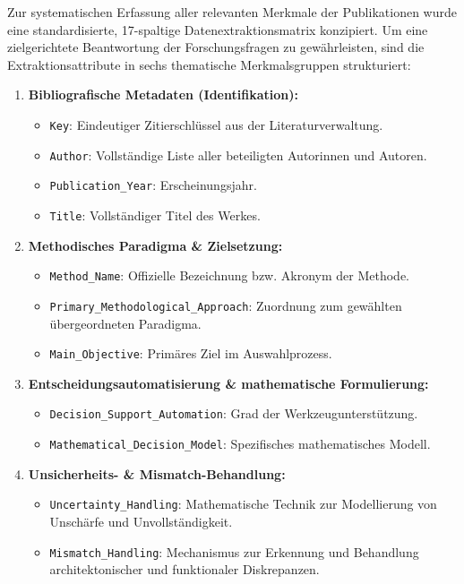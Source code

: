 Zur systematischen Erfassung aller relevanten Merkmale der Publikationen wurde eine standardisierte, 17-spaltige Datenextraktionsmatrix konzipiert. Um eine zielgerichtete Beantwortung der Forschungsfragen zu gewährleisten, sind die Extraktionsattribute in sechs thematische Merkmalsgruppen strukturiert:
\begin{enumerate}[label=\textbf{Gruppe \Roman*:}, leftmargin=*]
  \item \textbf{Bibliografische Metadaten (Identifikation):}
  \begin{itemize}[leftmargin=*]
    \item \texttt{Key}: Eindeutiger Zitierschlüssel aus der Literaturverwaltung.
    \item \texttt{Author}: Vollständige Liste aller beteiligten Autorinnen und Autoren.
    \item \texttt{Publication\_Year}: Erscheinungsjahr.
    \item \texttt{Title}: Vollständiger Titel des Werkes.
  \end{itemize}
  \item \textbf{Methodisches Paradigma \& Zielsetzung:}
  \begin{itemize}[leftmargin=*]
    \item \texttt{Method\_Name}: Offizielle Bezeichnung bzw. Akronym der Methode.
    \item \texttt{Primary\_Methodological\_Approach}: Zuordnung zum gewählten übergeordneten Paradigma.
    \item \texttt{Main\_Objective}: Primäres Ziel im Auswahlprozess.
  \end{itemize}
  \item \textbf{Entscheidungsautomatisierung \& mathematische Formulierung:}
  \begin{itemize}[leftmargin=*]
    \item \texttt{Decision\_Support\_Automation}: Grad der Werkzeugunterstützung.
    \item \texttt{Mathematical\_Decision\_Model}: Spezifisches mathematisches Modell.
  \end{itemize}
  \item \textbf{Unsicherheits- \& Mismatch-Behandlung:}
  \begin{itemize}[leftmargin=*]
    \item \texttt{Uncertainty\_Handling}: Mathematische Technik zur Modellierung von Unschärfe und Unvollständigkeit.
    \item \texttt{Mismatch\_Handling}: Mechanismus zur Erkennung und Behandlung architektonischer und funktionaler Diskrepanzen.

\end{itemize}
\end{enumerate}
